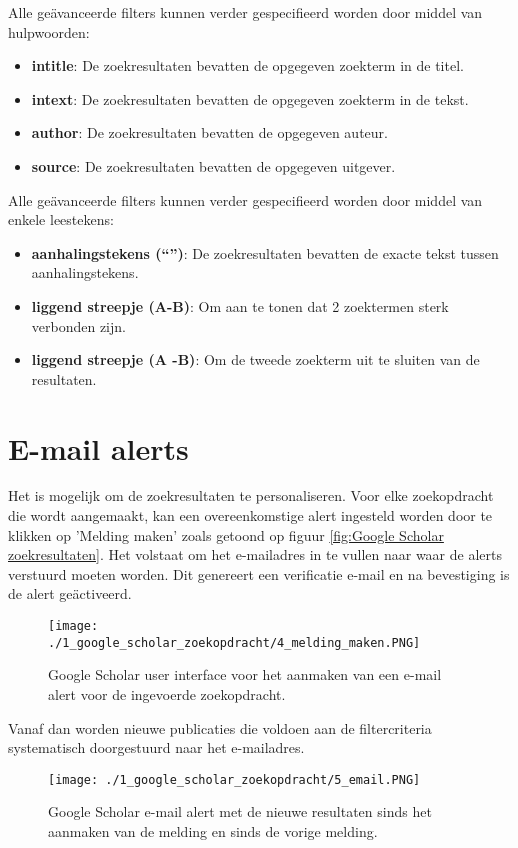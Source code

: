 Alle geävanceerde filters kunnen verder gespecifieerd worden door middel van hulpwoorden:
\begin{itemize}
    \item \textbf{intitle}: De zoekresultaten bevatten de opgegeven zoekterm in de titel.
    \item \textbf{intext}: De zoekresultaten bevatten de opgegeven zoekterm in de tekst.
    \item \textbf{author}: De zoekresultaten bevatten de opgegeven auteur.
    \item \textbf{source}: De zoekresultaten bevatten de opgegeven uitgever.
\end{itemize}

Alle geävanceerde filters kunnen verder gespecifieerd worden door middel van enkele leestekens:
\begin{itemize}
    \item \textbf{aanhalingstekens (``'')}: De zoekresultaten bevatten de exacte tekst tussen aanhalingstekens.
    \item \textbf{liggend streepje (A-B)}: Om aan te tonen dat 2 zoektermen sterk verbonden zijn.
    \item \textbf{liggend streepje (A -B)}: Om de tweede zoekterm uit te sluiten van de resultaten.
\end{itemize}

\section{E-mail alerts}
Het is mogelijk om de zoekresultaten te personaliseren. Voor elke zoekopdracht die wordt aangemaakt, kan een overeenkomstige alert ingesteld worden door te klikken op 'Melding maken' zoals getoond op figuur \ref{fig:Google Scholar zoekresultaten}.
Het volstaat om het e-mailadres in te vullen naar waar de alerts verstuurd moeten worden. Dit genereert een verificatie e-mail en na bevestiging is de alert geäctiveerd.

\begin{figure}
    \centering
    \texttt{[image: ./1\_google\_scholar\_zoekopdracht/4\_melding\_maken.PNG]}
    \caption[Google Scholar melding maken.]{\label{fig:Google Scholar melding maken}Google Scholar user interface voor het aanmaken van een e-mail alert voor de ingevoerde zoekopdracht.}
\end{figure}

Vanaf dan worden nieuwe publicaties die voldoen aan de filtercriteria systematisch doorgestuurd naar het e-mailadres.

\begin{figure}
    \centering
    \texttt{[image: ./1\_google\_scholar\_zoekopdracht/5\_email.PNG]}
    \caption[Google Scholar e-mail alert.]{\label{fig:Google Scholar email alert}Google Scholar e-mail alert met de nieuwe resultaten sinds het aanmaken van de melding en sinds de vorige melding.}
\end{figure}

